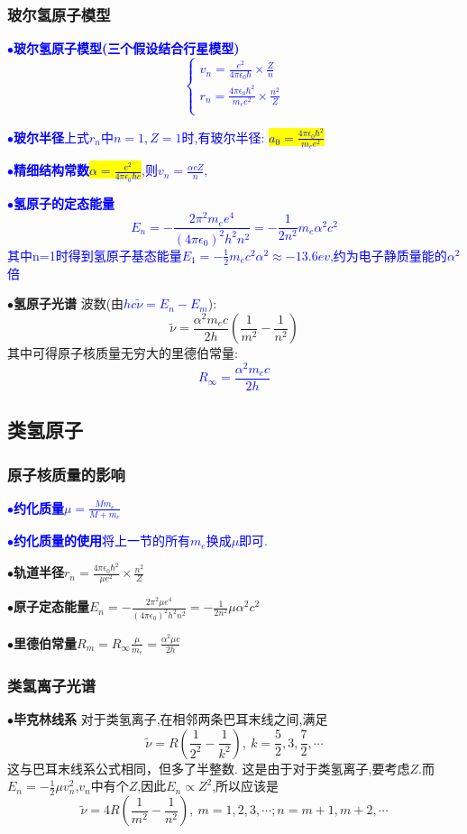 \documentclass[UTF8]{article}
\newcommand{\keypoint}[2]{$\bullet$\textbf{#1}\quad#2\par}
\begin{document}
\subsubsection{玻尔氢原子模型}
\textcolor{blue}{\keypoint{玻尔氢原子模型(三个假设结合行星模型)}{
	$$
	\left\{
	\begin{array}{l}
	v_n=\frac{e^2}{4\pi\epsilon_0\hbar}\times\frac{Z}{n}\\
	r_n=\frac{4\pi\epsilon_0\hbar^2}{m_ee^2}\times\frac{n^2}{Z}\\
	\end{array}
	\right.
	$$
}}
\textcolor{blue}{\keypoint{玻尔半径}{上式$r_n$中$n=1,Z=1$时,有玻尔半径: \colorbox{yellow}{$a_0=\frac{4\pi\epsilon_0\hbar^2}{m_ee^2}$}}}
\textcolor{blue}{\keypoint{精细结构常数}{\colorbox{yellow}{$\alpha=\frac{e^2}{4\pi\epsilon_0\hbar c}$},则$v_n=\frac{\alpha cZ}{n},$}}
\textcolor{blue}{\keypoint{氢原子的定态能量}{$$E_n=-\frac{2\pi^2m_ee^4}{(4\pi\epsilon_0)^2h^2n^2}=-\frac{1}{2n^2}m_e\alpha^2c^2$$ 其中n=1时得到氢原子基态能量$E_1=-\frac{1}{2}m_ec^2\alpha^2\approx-13.6ev$,约为电子静质量能的$\alpha^2$倍}}
\keypoint{氢原子光谱}{
	波数(由\textcolor{blue}{$hc\tilde{\nu}=E_n-E_m$}):
	$$\tilde{\nu}=\frac{\alpha^2m_ec}{2h}\left(\frac{1}{m^2}-\frac{1}{n^2}\right)$$
	其中可得原子核质量无穷大的里德伯常量:
	\textcolor{blue}{$$R_\infty=\frac{\alpha^2m_ec}{2h}$$}
}
\subsection{类氢原子}
\subsubsection{原子核质量的影响}
\textcolor{blue}{\keypoint{约化质量}{$\mu=\frac{Mm_e}{M+m_e}$}
\keypoint{约化质量的使用}{将上一节的所有$m_e$换成$\mu$即可.}}
\keypoint{轨道半径}{$r_n=\frac{4\pi\epsilon_0\hbar^2}{\mu e^2}\times\frac{n^2}{Z}$}
\keypoint{原子定态能量}{$E_n=-\frac{2\pi^2\mu e^4}{(4\pi\epsilon_0)^2h^2n^2}=-\frac{1}{2n^2}\mu\alpha^2c^2$}
\keypoint{里德伯常量}{$R_m=R_\infty\frac{\mu}{m_e}=\frac{\alpha^2\mu c}{2h}$}
\subsubsection{类氢离子光谱}
\keypoint{毕克林线系}{
	对于类氢离子,在相邻两条巴耳末线之间,满足
	$$\tilde{\nu}=R\left(\frac{1}{2^2}-\frac{1}{k^2}\right),\ k=\frac{5}{2},3,\frac{7}{2},\cdots$$
	这与巴耳末线系公式相同，但多了半整数.
	这是由于对于类氢离子,要考虑$Z$.而$E_n=-\frac{1}{2}\mu v_n^2$,$v_n$中有个$Z$,因此$E_n\propto Z^2$,所以应该是
	$$\tilde{\nu}=4R\left(\frac{1}{m^2}-\frac{1}{n^2}\right),\ m=1,2,3,\cdots;n=m+1,m+2,\cdots$$
}
\end{document}
